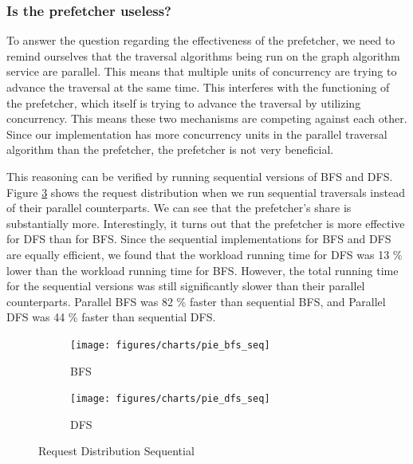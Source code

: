 \subsubsection{Is the prefetcher useless?}\label{sec:prefetcherUseless}
To answer the question regarding the effectiveness of the prefetcher,
we need to remind ourselves that the traversal algorithms being run on the graph
algorithm service are parallel. This means that multiple units of concurrency
are trying to advance the traversal at the same time. This interferes with the
functioning of the prefetcher, which itself is trying to advance the traversal by
utilizing concurrency. This means these two mechanisms are competing against
each other. Since our implementation has more concurrency units in the 
parallel traversal algorithm than the prefetcher, the prefetcher is not very
beneficial.

\medskip
This reasoning can be verified by running sequential versions of
BFS and DFS. Figure \ref{fig:reqDistSeq} shows the request distribution when we
run sequential traversals instead of their parallel counterparts. We can see
that the prefetcher's share is substantially more. Interestingly, it turns out
that the prefetcher is more effective for DFS than for BFS. Since the sequential
implementations for BFS and DFS are equally efficient, we found that the
workload running time for DFS was 13 \% lower than the workload running time 
for BFS. However, the total running time for the sequential versions was still
significantly slower than their parallel counterparts. Parallel BFS was 82 \%
faster than sequential BFS, and Parallel DFS was 44 \% faster than sequential
DFS.
\begin{figure}[ht]
    \centering
    \begin{subfigure}[b]{0.48\textwidth}
        \centering
        \texttt{[image: figures/charts/pie\_bfs\_seq]}
        \caption{BFS}
        \label{fig:bfsPieSeq}
    \end{subfigure}
    \hfill
    \begin{subfigure}[b]{0.48\textwidth}
        \texttt{[image: figures/charts/pie\_dfs\_seq]}
        \caption{DFS}
        \label{fig:dfsPieSeq}
    \end{subfigure}
    \caption{Request Distribution Sequential}
    \label{fig:reqDistSeq}
\end{figure}

